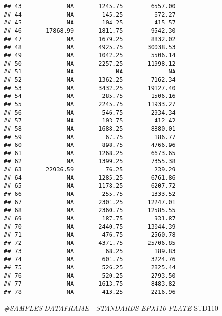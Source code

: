 \documentclass[]{article}
\newenvironment{Shaded}{\begin{snugshade}}{\end{snugshade}}
\newcommand{\CommentTok}[1]{\textcolor[rgb]{0.56,0.35,0.01}{\textit{#1}}}
\newcommand{\NormalTok}[1]{#1}
\begin{document}
\begin{verbatim}
## 43             NA       1245.75        6557.00
## 44             NA        145.25         672.27
## 45             NA        104.25         415.57
## 46       17868.99       1811.75        9542.30
## 47             NA       1679.25        8832.02
## 48             NA       4925.75       30038.53
## 49             NA       1042.25        5506.14
## 50             NA       2257.25       11998.12
## 51             NA            NA             NA
## 52             NA       1362.25        7162.34
## 53             NA       3432.25       19127.40
## 54             NA        285.75        1506.16
## 55             NA       2245.75       11933.27
## 56             NA        546.75        2934.34
## 57             NA        103.75         412.42
## 58             NA       1688.25        8880.01
## 59             NA         67.75         186.77
## 60             NA        898.75        4766.96
## 61             NA       1268.25        6673.65
## 62             NA       1399.25        7355.38
## 63       22936.59         76.25         239.29
## 64             NA       1285.25        6761.86
## 65             NA       1178.25        6207.72
## 66             NA        255.75        1333.52
## 67             NA       2301.25       12247.01
## 68             NA       2360.75       12585.55
## 69             NA        187.75         931.87
## 70             NA       2440.75       13044.39
## 71             NA        476.75        2560.78
## 72             NA       4371.75       25706.85
## 73             NA         68.25         189.83
## 74             NA        601.75        3224.76
## 75             NA        526.25        2825.44
## 76             NA        520.25        2793.50
## 77             NA       1613.75        8483.82
## 78             NA        413.25        2216.96
\end{verbatim}

\begin{Shaded}
\begin{Highlighting}[]
\CommentTok{#SAMPLES DATAFRAME - STANDARDS EPX110 PLATE}
\NormalTok{STD110}
\end{Highlighting}
\end{Shaded}
\end{document}

